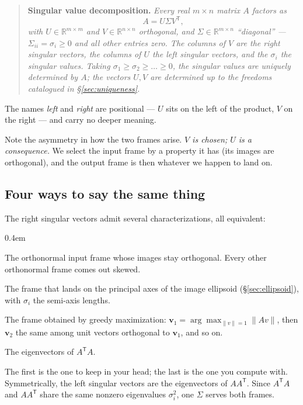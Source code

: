 \documentclass[11pt]{article}
\numberwithin{equation}{section}
\newcommand{\R}{\mathbb{R}}
\newcommand{\T}{^{\mathsf{T}}}
\newcommand{\vv}[1]{\mathbf{v}_{#1}}
\theoremstyle{plainish}
\begin{document}
\begin{quote}
\textbf{Singular value decomposition.} \itshape Every real $m \times n$ matrix
$A$ factors as
\[
A = U\Sigma V\T,
\]
with $U \in \R^{m\times m}$ and $V \in \R^{n\times n}$ orthogonal, and
$\Sigma \in \R^{m\times n}$ ``diagonal'' --- $\Sigma_{ii} = \sigma_i \geq 0$ and
all other entries zero. The columns of $V$ are the right singular vectors, the
columns of $U$ the left singular vectors, and the $\sigma_i$ the singular
values. Taking $\sigma_1 \geq \sigma_2 \geq \dots \geq 0$, the singular values
are uniquely determined by $A$; the vectors $U, V$ are determined up to the
freedoms catalogued in \S\ref{sec:uniqueness}.
\end{quote}

\noindent
The names \emph{left} and \emph{right} are positional --- $U$ sits on the left
of the product, $V$ on the right --- and carry no deeper meaning.

Note the asymmetry in how the two frames arise. \emph{$V$ is chosen; $U$ is a
consequence.} We select the input frame by a property it has (its images are
orthogonal), and the output frame is then whatever we happen to land on.

\subsection*{Four ways to say the same thing}

The right singular vectors admit several characterizations, all equivalent:

\begin{description}\itemsep0.4em
\item[Geometric.] The orthonormal input frame whose images stay orthogonal.
Every other orthonormal frame comes out skewed.
\item[Metric.] The frame that lands on the principal axes of the image
ellipsoid (\S\ref{sec:ellipsoid}), with $\sigma_i$ the semi-axis lengths.
\item[Variational.] The frame obtained by greedy maximization:
$\vv1 = \arg\max_{\|v\|=1} \|Av\|$, then $\vv2$ the same among unit vectors
orthogonal to $\vv1$, and so on.
\item[Algebraic.] The eigenvectors of $A\T A$.
\end{description}

The first is the one to keep in your head; the last is the one you compute
with. Symmetrically, the left singular vectors are the eigenvectors of $AA\T$.
Since $A\T A$ and $AA\T$ share the same nonzero eigenvalues $\sigma_i^2$, one
$\Sigma$ serves both frames.
\end{document}
